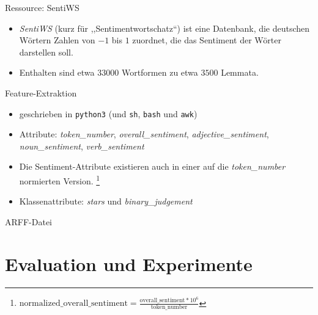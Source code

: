 \documentclass[note=hide]{beamer} %
\newcommand{\proglang}[1]{\texttt{#1}}
\newcommand{\feature}[1]{\emph{#1}}
\newcommand{\checkthis}[1]{#1}
\begin{document}
\begin{frame}{Ressource: SentiWS}
	\begin{itemize}
		\item \emph{SentiWS} (kurz für ,,Sentimentwortschatz``) ist eine Datenbank, die deutschen Wörtern Zahlen von $-1$ bis $1$ zuordnet, die das \checkthis{Sentiment} der Wörter darstellen soll.
		\item Enthalten sind etwa $33000$ Wortformen zu etwa $3500$ Lemmata.
	\end{itemize}
	{
		
	}
\end{frame}

\begin{frame}{Feature-Extraktion}
	\begin{itemize}
		\item geschrieben in \proglang{python3} (und \proglang{sh}, \proglang{bash} und \proglang{awk})
		\item Attribute: \feature{token\_number}, \feature{overall\_sentiment}, \feature{adjective\_sentiment}, \feature{noun\_sentiment}, \feature{verb\_sentiment}
		\item Die Sentiment-Attribute existieren auch in einer auf die \feature{token\_number} normierten Version.
			\footnote{$\text{normalized\_overall\_sentiment} = \frac{\text{overall\_sentiment} * 10^6}{\text{token\_number}}$}
		\item Klassenattribute: \feature{stars} und \feature{binary\_judgement}
	\end{itemize}
	
\end{frame}

\begin{frame}{ARFF-Datei}
	
\end{frame}

\section{Evaluation und Experimente}
\end{document}
